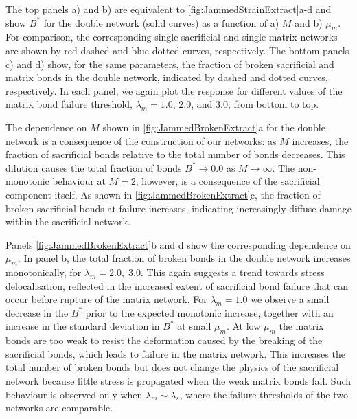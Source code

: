 \documentclass[asymmetricmargins]{library/duthesis}%
\begin{document}
The top panels a) and b) are equivalent to \cref{fig:JammedStrainExtract}a-d and show $B^*$ for the double network (solid curves) as a function of a) $M$ and b) $\mu_m$. For comparison, the corresponding single sacrificial and single matrix networks are shown by red dashed and blue dotted curves, respectively. The bottom panels c) and d) show, for the same parameters, the fraction of broken sacrificial and matrix bonds in the double network, indicated by dashed and dotted curves, respectively. In each panel, we again plot the response for different values of the matrix bond failure threshold, $\lambda_m=1.0$, $2.0$, and $3.0$, from bottom to top. 

The dependence on $M$ shown in \cref{fig:JammedBrokenExtract}a for the double network is a consequence of the construction of our networks: as $M$ increases, the fraction of sacrificial bonds relative to the total number of bonds decreases. This dilution causes the total fraction of bonds $ B^* \to 0.0$ as $M\to\infty$. The non-monotonic behaviour at $M=2$, however, is a consequence of the sacrificial component itself. As shown in \cref{fig:JammedBrokenExtract}c, the fraction of broken sacrificial bonds at failure increases, indicating increasingly diffuse damage within the sacrificial network.

Panels \cref{fig:JammedBrokenExtract}b and d show the corresponding dependence on $\mu_m$. In panel b, the total fraction of broken bonds in the double network increases monotonically, for $\lambda_m = 2.0, \; 3.0$. This again suggests a trend towards stress delocalisation, reflected in the increased extent of sacrificial bond failure that can occur before rupture of the matrix network. For $\lambda_m =1.0$ we observe a small decrease in the $B^*$ prior to the expected monotonic increase, together with an increase in the standard deviation in $B^*$ at small $\mu_m$. At low $\mu_m$ the matrix bonds are too weak to resist the deformation caused by the breaking of the sacrificial bonds, which leads to failure in the matrix network. This increases the total number of broken bonds but does not change the physics of the sacrificial network because little stress is propagated when the weak matrix bonds fail. Such behaviour is observed only when $\lambda_m \sim \lambda_s$, where the failure thresholds of the two networks are comparable.
\end{document}
